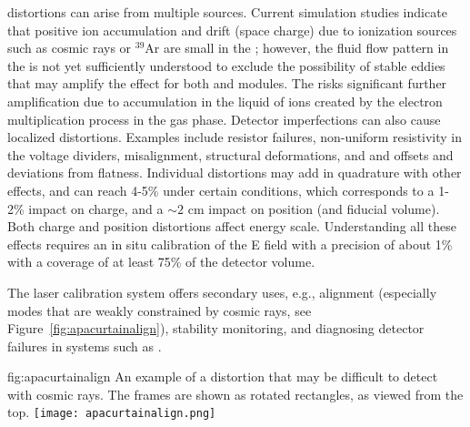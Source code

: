\efield distortions can arise from multiple sources. Current simulation studies indicate that positive ion accumulation and drift (space charge) due to ionization sources such as cosmic rays or ${}^{39}$Ar are small in the ; however, the fluid flow pattern in the  is not yet sufficiently understood to exclude the possibility of stable eddies that may amplify the effect for both \single and \dual modules. The  risks significant further amplification due to  accumulation in the liquid of ions created by the electron multiplication process in the gas phase.
Detector imperfections can also cause localized \efield distortions. Examples include  resistor failures, non-uniform resistivity in the voltage dividers,  misalignment,  structural deformations, and  and  offsets and  deviations from flatness. Individual \efield distortions may add in quadrature with other effects, and can reach 4-5\% under certain conditions, which corresponds to a 1-2\% impact on charge, 
and a $\sim 2$ cm impact on position (and fiducial volume). Both charge and position distortions affect energy scale. Understanding all these effects requires an in situ calibration of the E field with a precision of about 1\% with a coverage of at least 75\% of the detector volume.

The laser calibration system offers secondary uses, e.g., alignment (especially modes that are weakly constrained by cosmic rays, see Figure~\ref{fig:apacurtainalign}), stability monitoring, and diagnosing detector failures in systems such as .  

\begin{dunefigure}{fig:apacurtainalign}
{An example of a distortion that may be difficult to detect with cosmic rays.  The  frames are shown as rotated rectangles, as viewed from the top.}
\texttt{[image: apacurtainalign.png]}
\end{dunefigure}

